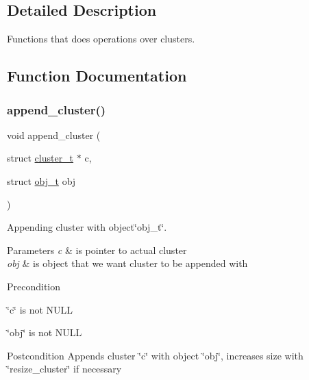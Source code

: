 \subsection{Detailed Description}
Functions that does operations over clusters. 



\subsection{Function Documentation}
\mbox{\label{group___cluster_operations_gab6269b64b2c7f4842a51c58b2d86a2e5}} 
\subsubsection{\texorpdfstring{append\+\_\+cluster()}{append\_cluster()}}
{\footnotesize\ttfamily void append\+\_\+cluster (\begin{DoxyParamCaption}\item[{struct \mbox{\hyperlink{structcluster__t}{cluster\+\_\+t}} $\ast$}]{c,  }\item[{struct \mbox{\hyperlink{structobj__t}{obj\+\_\+t}}}]{obj }\end{DoxyParamCaption})}



Appending cluster with object\char`\"{}obj\+\_\+t\char`\"{}. 


\begin{DoxyParams}{Parameters}
{\em c} & is pointer to actual cluster\\
\hline
{\em obj} & is object that we want cluster to be appended with\\
\hline
\end{DoxyParams}
\begin{DoxyPrecond}{Precondition}

\begin{DoxyItemize}
\item \char`\"{}c\char`\"{} is not N\+U\+LL
\item \char`\"{}obj\char`\"{} is not N\+U\+LL
\end{DoxyItemize}
\end{DoxyPrecond}
\begin{DoxyPostcond}{Postcondition}
Appends cluster \char`\"{}c\char`\"{} with object \char`\"{}obj\char`\"{}, increases size with \char`\"{}resize\+\_\+cluster\char`\"{} if necessary 
\end{DoxyPostcond}
\mbox{\label{group___cluster_operations_ga8289f092f205baeb13cf33cfffa15324}} 
